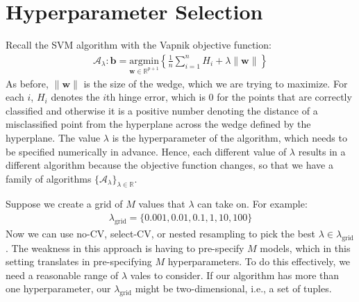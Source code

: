 \documentclass[12pt, a4paper]{article}
\theoremstyle{definition}
\begin{document}
	\section*{Hyperparameter Selection}
	Recall the SVM algorithm with the Vapnik objective function:
	\begin{align*}
		\mathcal{A}_{\lambda}:\bm{b} = \underset{\bm{w}\in\mathbb{R}^{p+1}}{\text{argmin}}
		\left\{
		\frac{1}{n}\sum_{i=1}^{n}H_i + 
		\lambda \|\bm{w}\|
		\right\}
	\end{align*}
	As before, $\|\bm{w}\|$ is the size of the wedge, which we are trying
	to maximize. For each $i$, $H_i$ denotes the $i$th hinge error, which is $0$
	for the points that are correctly classified and otherwise it is a positive
	number denoting the distance of a misclassified point from the hyperplane across
	the wedge defined by the hyperplane. The value $\lambda$ is the hyperparameter
	of the algorithm, which needs to be specified numerically in advance. Hence,
	each different value of $\lambda$ results in a different algorithm because
	the objective function changes, so that we have a family of algorithms
	$\{\mathcal{A}_\lambda\}_{\lambda\in\mathbb{R}}$.
	
	Suppose we create a grid of $M$ values that $\lambda$ can take on. For example:
	\begin{align*}
		\lambda_{\text{grid}} = \{
		0.001, 0.01, 0.1, 1, 10, 100
		\}
	\end{align*}
	Now we can use no-CV, select-CV, or nested resampling to pick the best
	$\lambda\in \lambda_{\text{grid}}$. The weakness in this approach is having
	to pre-specify $M$ models, which in this setting translates in pre-specifying
	$M$ hyperparameters. To do this effectively, we need a reasonable range of $\lambda$
	vales to consider. If our algorithm has more than one hyperparameter,
	our $\lambda_{\text{grid}}$ might be two-dimensional, i.e., a set of tuples.
	\pagebreak
	\printbibliography
\end{document}
